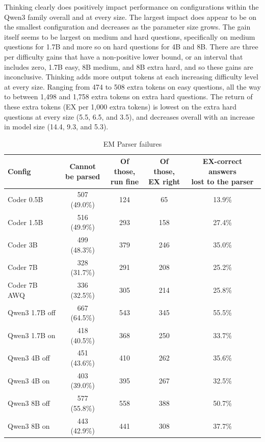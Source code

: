Thinking clearly does positively impact performance on configurations within the Qwen3 family overall and at every size. The largest impact does appear to be on the smallest configuration and decreases as the parameter size grows. The gain itself seems to be largest on medium and hard questions, specifically on medium questions for 1.7B and more so on hard questions for 4B and 8B. There are three per difficulty gains that have a non-positive lower bound, or an interval that includes zero, 1.7B easy, 8B medium, and 8B extra hard, and so these gains are inconclusive. Thinking adds more output tokens at each increasing difficulty level at every size. Ranging from 474 to 508 extra tokens on easy questions, all the way to between 1,498 and 1,758 extra tokens on extra hard questions. The return of these extra tokens (EX per 1,000 extra tokens) is lowest on the extra hard questions at every size (5.5, 6.5, and 3.5), and decreases overall with an increase in model size (14.4, 9.3, and 5.3).

\begin{table}[!htbp]
\centering
\caption{EM Parser failures}
\label{tab:7}
\small
\begin{adjustbox}{max width=\linewidth}
\begin{tabular}{@{}lcccc@{}}
\toprule
Config & \makecell{Cannot \\ {}be parsed} & \makecell{Of those, \\ {}run fine} & \makecell{Of those, \\ {}EX right} & \makecell{EX-correct answers \\ {}lost to the parser} \\
\midrule
Coder 0.5B & 507 (49.0\%) & 124 & 65 & 13.9\% \\
Coder 1.5B & 516 (49.9\%) & 293 & 158 & 27.4\% \\
Coder 3B & 499 (48.3\%) & 379 & 246 & 35.0\% \\
Coder 7B & 328 (31.7\%) & 291 & 208 & 25.2\% \\
Coder 7B AWQ & 336 (32.5\%) & 305 & 214 & 25.8\% \\
Qwen3 1.7B off & 667 (64.5\%) & 543 & 345 & 55.5\% \\
Qwen3 1.7B on & 418 (40.5\%) & 368 & 250 & 33.7\% \\
Qwen3 4B off & 451 (43.6\%) & 410 & 262 & 35.6\% \\
Qwen3 4B on & 403 (39.0\%) & 395 & 267 & 32.5\% \\
Qwen3 8B off & 577 (55.8\%) & 558 & 388 & 50.7\% \\
Qwen3 8B on & 443 (42.9\%) & 441 & 308 & 37.7\% \\
\bottomrule
\end{tabular}
\end{adjustbox}
\par{}
\end{table}


